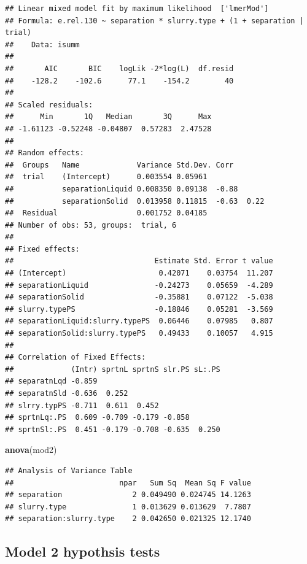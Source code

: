 \documentclass[
]{article}
\newenvironment{Shaded}{\begin{snugshade}}{\end{snugshade}}
\newcommand{\FunctionTok}[1]{\textcolor[rgb]{0.13,0.29,0.53}{\textbf{#1}}}
\newcommand{\NormalTok}[1]{#1}
\begin{document}
\begin{verbatim}
## Linear mixed model fit by maximum likelihood  ['lmerMod']
## Formula: e.rel.130 ~ separation * slurry.type + (1 + separation | trial)
##    Data: isumm
## 
##       AIC       BIC    logLik -2*log(L)  df.resid 
##    -128.2    -102.6      77.1    -154.2        40 
## 
## Scaled residuals: 
##      Min       1Q   Median       3Q      Max 
## -1.61123 -0.52248 -0.04807  0.57283  2.47528 
## 
## Random effects:
##  Groups   Name             Variance Std.Dev. Corr       
##  trial    (Intercept)      0.003554 0.05961             
##           separationLiquid 0.008350 0.09138  -0.88      
##           separationSolid  0.013958 0.11815  -0.63  0.22
##  Residual                  0.001752 0.04185             
## Number of obs: 53, groups:  trial, 6
## 
## Fixed effects:
##                                Estimate Std. Error t value
## (Intercept)                     0.42071    0.03754  11.207
## separationLiquid               -0.24273    0.05659  -4.289
## separationSolid                -0.35881    0.07122  -5.038
## slurry.typePS                  -0.18846    0.05281  -3.569
## separationLiquid:slurry.typePS  0.06446    0.07985   0.807
## separationSolid:slurry.typePS   0.49433    0.10057   4.915
## 
## Correlation of Fixed Effects:
##             (Intr) sprtnL sprtnS slr.PS sL:.PS
## separatnLqd -0.859                            
## separatnSld -0.636  0.252                     
## slrry.typPS -0.711  0.611  0.452              
## sprtnLq:.PS  0.609 -0.709 -0.179 -0.858       
## sprtnSl:.PS  0.451 -0.179 -0.708 -0.635  0.250
\end{verbatim}

\begin{Shaded}
\begin{Highlighting}[]
\FunctionTok{anova}\NormalTok{(mod2)}
\end{Highlighting}
\end{Shaded}

\begin{verbatim}
## Analysis of Variance Table
##                        npar   Sum Sq  Mean Sq F value
## separation                2 0.049490 0.024745 14.1263
## slurry.type               1 0.013629 0.013629  7.7807
## separation:slurry.type    2 0.042650 0.021325 12.1740
\end{verbatim}

\subsection{Model 2 hypothsis tests}\label{model-2-hypothsis-tests}
\end{document}
